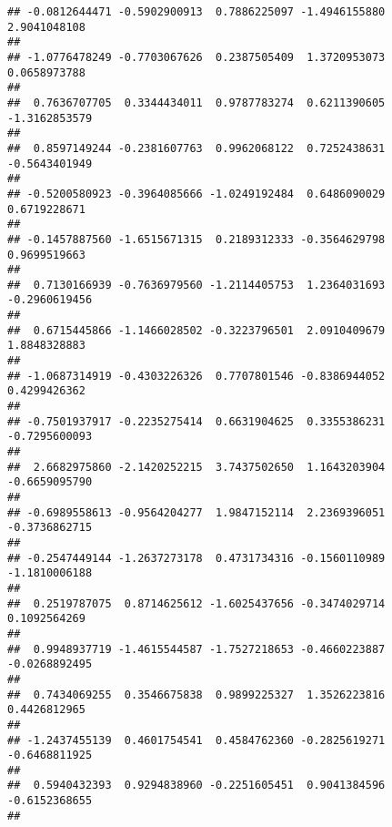 \documentclass[]{article}
\begin{document}
\begin{verbatim}
## -0.0812644471 -0.5902900913  0.7886225097 -1.4946155880  2.9041048108 
##                                                                       
## -1.0776478249 -0.7703067626  0.2387505409  1.3720953073  0.0658973788 
##                                                                       
##  0.7636707705  0.3344434011  0.9787783274  0.6211390605 -1.3162853579 
##                                                                       
##  0.8597149244 -0.2381607763  0.9962068122  0.7252438631 -0.5643401949 
##                                                                       
## -0.5200580923 -0.3964085666 -1.0249192484  0.6486090029  0.6719228671 
##                                                                       
## -0.1457887560 -1.6515671315  0.2189312333 -0.3564629798  0.9699519663 
##                                                                       
##  0.7130166939 -0.7636979560 -1.2114405753  1.2364031693 -0.2960619456 
##                                                                       
##  0.6715445866 -1.1466028502 -0.3223796501  2.0910409679  1.8848328883 
##                                                                       
## -1.0687314919 -0.4303226326  0.7707801546 -0.8386944052  0.4299426362 
##                                                                       
## -0.7501937917 -0.2235275414  0.6631904625  0.3355386231 -0.7295600093 
##                                                                       
##  2.6682975860 -2.1420252215  3.7437502650  1.1643203904 -0.6659095790 
##                                                                       
## -0.6989558613 -0.9564204277  1.9847152114  2.2369396051 -0.3736862715 
##                                                                       
## -0.2547449144 -1.2637273178  0.4731734316 -0.1560110989 -1.1810006188 
##                                                                       
##  0.2519787075  0.8714625612 -1.6025437656 -0.3474029714  0.1092564269 
##                                                                       
##  0.9948937719 -1.4615544587 -1.7527218653 -0.4660223887 -0.0268892495 
##                                                                       
##  0.7434069255  0.3546675838  0.9899225327  1.3526223816  0.4426812965 
##                                                                       
## -1.2437455139  0.4601754541  0.4584762360 -0.2825619271 -0.6468811925 
##                                                                       
##  0.5940432393  0.9294838960 -0.2251605451  0.9041384596 -0.6152368655 
##                                                                       

\end{verbatim}
\end{document}
